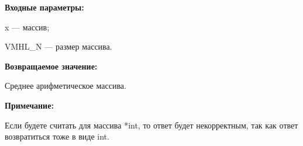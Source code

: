 \textbf{Входные параметры:}

 x --- массив;
 
 VMHL\_N --- размер массива.

\textbf{Возвращаемое значение:}

 Среднее арифметическое массива.
 
\textbf{Примечание:}

Если будете считать для массива *int, то ответ будет некорректным, так как ответ возвратиться тоже в виде int.
 
